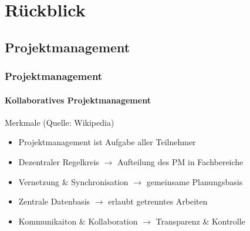 \section{Rückblick}

\author{Erivn Mazlagi\'c}

\subsection{Projektmanagement}
\begin{frame}
	\frametitle{Projektmanagement\hfill{}\footnotesize \group}
	\framesubtitle{Kollaboratives Projektmanagement}
	\begin{block}{Merkmale (Quelle: Wikipedia)}
		\begin{itemize}
			\item Projektmanagement ist Aufgabe aller Teilnehmer
			\item Dezentraler Regelkreis $\rightarrow$ Aufteilung des PM in Fachbereiche
			\item Vernetzung \& Synchronisation $\rightarrow$ gemeinsame Planungsbasis
			\item Zentrale Datenbasis $\rightarrow$ erlaubt getrenntes Arbeiten
			\item Kommunikaiton \& Kollaboration $\rightarrow$ Transparenz \& Kontrolle
		\end{itemize}
	\end{block}
\end{frame}

